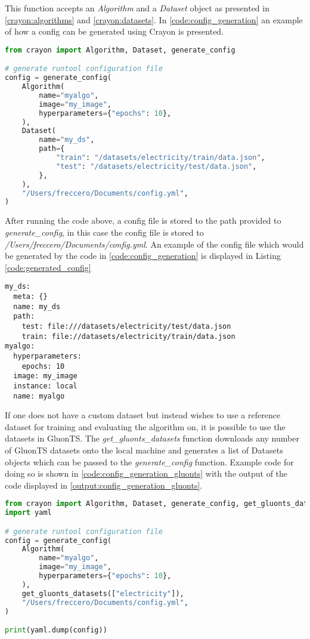 This function accepts an \textit{Algorithm} and a \textit{Dataset} object as presented in \ref{crayon:algorithms} and \ref{crayon:datasets}. In \ref{code:config_generation} an example of how a config can be generated using Crayon is presented.
\\
\begin{lstlisting}[language=Python, label={code:config_generation}, caption=Config generation using Crayon]
from crayon import Algorithm, Dataset, generate_config

# generate runtool configuration file
config = generate_config(
    Algorithm(
        name="myalgo",
        image="my_image",
        hyperparameters={"epochs": 10},
    ),
    Dataset(
        name="my_ds",
        path={
            "train": "/datasets/electricity/train/data.json",
            "test": "/datasets/electricity/test/data.json",
        },
    ),
    "/Users/freccero/Documents/config.yml",
)
\end{lstlisting}

After running the code above, a config file is stored to the path provided to \textit{generate\_config}, in this case the config file is stored to \textit{/Users/freccero/Documents/config.yml}. An example of the config file which would be generated by the code in \ref{code:config_generation} is displayed in Listing \ref{code:generated_config}
\\
\begin{lstlisting}[label={code:generated_config}, caption=Generated configurations file.]
my_ds:
  meta: {}
  name: my_ds
  path:
    test: file:///datasets/electricity/test/data.json
    train: file://datasets/electricity/train/data.json
myalgo:
  hyperparameters:
    epochs: 10
  image: my_image
  instance: local
  name: myalgo
\end{lstlisting}

If one does not have a custom dataset but instead wishes to use a reference dataset for training and evaluating the algorithm on, it is possible to use the datasets in GluonTS. The \textit{get\_gluonts\_datasets} function downloads any number of GluonTS datasets onto the local machine and generates a list of Datasets objects which can be passed to the  \textit{generate\_config} function. Example code for doing so is shown in \ref{code:config_generation_gluonts} with the output of the code displayed in \ref{output:config_generation_gluonts}. 

\begin{lstlisting}[language=Python, label={code:config_generation_gluonts}, caption=Config generation using Crayon with gluonts datasets]
from crayon import Algorithm, Dataset, generate_config, get_gluonts_datasets
import yaml

# generate runtool configuration file
config = generate_config(
    Algorithm(
        name="myalgo",
        image="my_image",
        hyperparameters={"epochs": 10},
    ),
    get_gluonts_datasets(["electricity"]),
    "/Users/freccero/Documents/config.yml",
)

print(yaml.dump(config))
\end{lstlisting}

